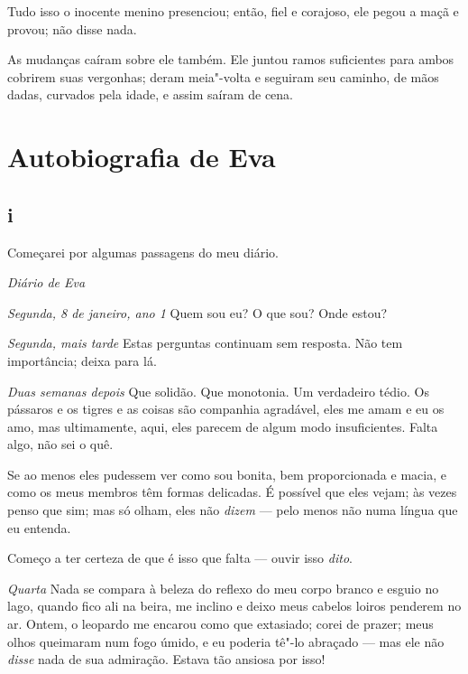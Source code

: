 Tudo isso o inocente menino presenciou; então, fiel e corajoso, ele
pegou a maçã e provou; não disse nada.

As mudanças caíram sobre ele também. Ele juntou ramos suficientes
para ambos cobrirem suas vergonhas; deram meia"-volta e seguiram seu
caminho, de mãos dadas, curvados pela idade, e assim saíram de cena.


\chapter{Autobiografia de Eva}

\section*{i}

\begin{center}
Começarei por algumas passagens do meu diário.
\end{center}

\begin{center}
\textit{Diário de Eva}
\end{center}


\noindent\textit{Segunda, 8 de janeiro, ano 1} Quem sou eu? O que sou? Onde estou?

\textit{Segunda, mais tarde} Estas perguntas continuam sem resposta. Não tem importância; deixa para lá.

\textit{Duas semanas depois} Que solidão. Que monotonia. Um verdadeiro tédio. Os pássaros e os tigres
e as coisas são companhia agradável, eles me amam e eu os amo, mas ultimamente, aqui, eles parecem
de algum modo insuficientes. Falta algo, não sei o quê.

Se ao menos eles pudessem ver como sou bonita, bem proporcionada e macia, e como os
meus membros têm formas delicadas. É possível que eles vejam; às vezes penso que sim; mas só
olham, eles não \textit{dizem} --- pelo menos não numa língua que eu entenda.

Começo a ter certeza de que é isso que falta --- ouvir isso \textit{dito}.

\textit{Quarta} Nada se compara à beleza do reflexo do meu corpo branco e esguio no lago,
quando fico ali na beira, me inclino e deixo meus cabelos loiros penderem no ar.
Ontem, o leopardo me encarou como que extasiado; corei de prazer;
meus olhos queimaram num fogo úmido, e eu poderia tê"-lo abraçado --- mas ele não \textit{disse}
nada de sua admiração. Estava tão ansiosa por isso!

